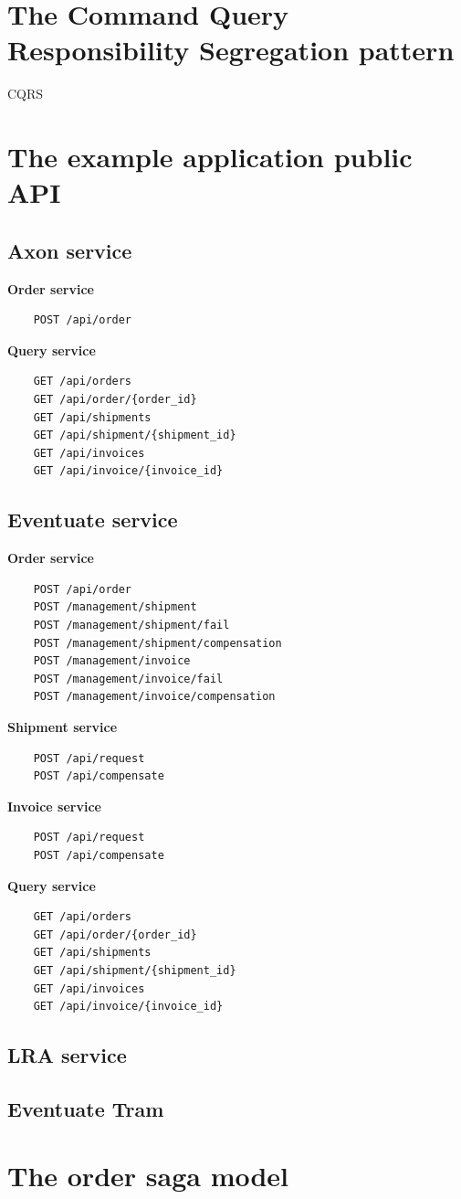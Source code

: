 \documentclass[oneside,
  digital, %
  table,   %
  nolof,     %
  nolot,     %
]{fithesis3}
\begin{document}
\chapter{The Command Query Responsibility Segregation pattern}

CQRS

\chapter{The example application public API}

\section{Axon service}

\textbf{Order service}

\begin{verbatim}
	POST /api/order
\end{verbatim}

\noindent
\textbf{Query service}

\begin{verbatim}
	GET /api/orders
	GET /api/order/{order_id}
	GET /api/shipments
	GET /api/shipment/{shipment_id}
	GET /api/invoices
	GET /api/invoice/{invoice_id}
\end{verbatim}

\section{Eventuate service}

\textbf{Order service}

\begin{verbatim}
	POST /api/order
	POST /management/shipment
	POST /management/shipment/fail
	POST /management/shipment/compensation
	POST /management/invoice
	POST /management/invoice/fail
	POST /management/invoice/compensation
\end{verbatim}

\noindent
\textbf{Shipment service}

\begin{verbatim}
	POST /api/request
	POST /api/compensate
\end{verbatim}

\noindent
\textbf{Invoice service}

\begin{verbatim}
	POST /api/request
	POST /api/compensate
\end{verbatim}

\noindent
\textbf{Query service}

\begin{verbatim}
	GET /api/orders
	GET /api/order/{order_id}
	GET /api/shipments
	GET /api/shipment/{shipment_id}
	GET /api/invoices
	GET /api/invoice/{invoice_id}
\end{verbatim}

\section{LRA service}

\section{Eventuate Tram}



\chapter{The order saga model}
\end{document}

